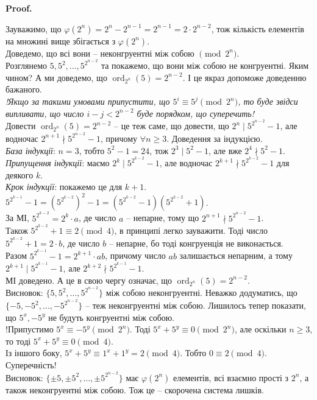 \documentclass[a4paper, 14pt]{extarticle}
\makeatletter
\theoremstyle{theoremdd}
\theoremstyle{theoremdd}
\theoremstyle{theoremdd}
\theoremstyle{theoremdd}
\theoremstyle{theoremdd}
\theoremstyle{theoremdd}
\theoremstyle{theoremdd}
\theoremstyle{theoremdd}
\def\qed{$\blacksquare$}
\renewenvironment{proof}[1][Proof.\\]{\par
\pushQED{\hfill \qed}%
\normalfont \topsep6\p@\@plus6\p@\relax
\trivlist
\item\relax
{\bfseries
#1\@addpunct{.}}\hspace\labelsep\ignorespaces
}{%
\popQED\endtrivlist\@endpefalse
}
\DeclareMathOperator{\ord}{ord}
\makeatother
\begin{document}
\begin{proof}
Зауважимо, що $\varphi(2^n) = 2^n - 2^{n-1} = 2^{n-1} = 2 \cdot 2^{n-2}$, тож кількість елементів на множині вище збігається з $\varphi(2^n)$.\\
Доведемо, що всі вони -- неконгруентні між собою $\pmod {2^n}$.\\
Розглянемо $5,5^2,\dots,5^{2^{n-2}}$ та покажемо, що вони між собою не конгруентні. Яким чином? А ми доведемо, що $\ord_{2^n} (5) = 2^{n-2}$. І це якраз допоможе доведенню бажаного.\\
\textit{!Якщо за такими умовами припустити, що $5^i \equiv 5^j \pmod {2^n}$, то буде звідси випливати, що число $i-j < 2^{n-2}$ буде порядком, що суперечить!}\\
\iffalse
Маємо $\ord_{2^n}(5) \mid \underset{=\varphi(2^{n})}{2^{n-1}}$. Але оскільки для $\pmod {2^n}$ не існує первісного кореня, то $\ord_{2^n}(5) < 2^{n-1}$. Тому можна гарантувати, що виконується $\ord_{2^n}(5) \mid \dfrac{2^{n-1}}{2} = 2^{n-2}$.\\
\fi
Довести $\ord_{2^n} (5) = 2^{n-2}$ -- це теж саме, що довести, що $2^n \mid 5^{2^{n-2}}-1$, але водночас $2^{n+1} \nmid 5^{2^{n-2}} - 1$, причому $\forall n \geq 3$. Доведення за індукцією.\\
\textit{База індукції}: $n=3$, тобто $5^2-1 = 24$, тож $2^3 \mid 5^2-1$, але вже $2^4 \nmid 5^2-1$.\\
\textit{Припущення індукції}: маємо $2^k \mid 5^{2^{k-2}}-1$, але водночас $2^{k+1} \nmid 5^{2^{k-2}} - 1$ для деякого $k$.\\
\textit{Крок індукції}: покажемо це для $k+1$.\\
$5^{2^{k-1}} - 1 = (5^{2^{k-2}})^2 - 1 = \left( 5^{2^{k-2}}-1 \right) \left( 5^{2^{k-2}}+1 \right)$.\\
За МІ, $5^{2^{k-2}} = 2^k \cdot a$, де число $a$ -- непарне, тому що $2^{n+1} \nmid 5^{2^{n-2}}-1$.\\
Також $5^{2^{k-2}}+1 \equiv 2 \pmod 4$, в принципі легко зауважити. Тоді число $5^{2^{k-2}}+1 =2 \cdot b$, де число $b$ -- непарне, бо тоді конгруенція не виконається.\\
Разом $5^{2^{k-1}} -1 = 2^{k+1} \cdot ab$, причому число $ab$ залишається непарним, а тому $2^{k+1} \mid 5^{2^{k-1}} -1$, але $2^{k+2} \nmid 5^{2^{k-1}} -1$.\\
МІ доведено. А це в свою чергу означає, що $\ord_{2^n}(5) = 2^{n-2}$.
\bigskip \\
Висновок: $\{5,5^2,\dots,5^{2^{n-2}}\}$ між собою неконгруентні. Неважко додуматись, що $\{-5,-5^2,\dots,-5^{2^{n-2}}\}$ -- теж неконгруентні між собою. Лишилось тепер показати, що $5^x, -5^y$ не будуть конгруентні між собою.\\
!Припустимо $5^x \equiv - 5^y \pmod {2^n}$. Тоді $5^x + 5^y \equiv 0 \pmod {2^n}$, але оскільки $n \geq 3$, то тоді $5^x + 5^y \equiv 0 \pmod 4$.\\
Із іншого боку, $5^x + 5^y \equiv 1^x + 1^y = 2 \pmod 4$. Тобто $0 \equiv 2 \pmod 4$. Суперечність!\\
Висновок: $\{\pm 5, \pm 5^2, \dots, \pm 5^{2^{n-2}}\}$ має $\varphi(2^n)$ елементів, всі взаємно прості з $2^n$, а також неконгруентні між собою. Тож це -- скорочена система лишків.
\end{proof}
\end{document}
